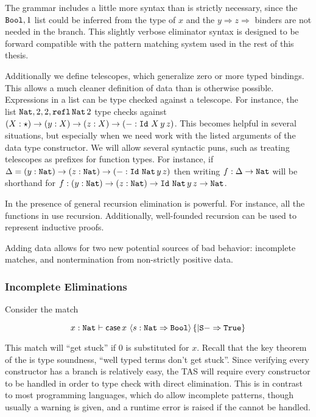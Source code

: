 The grammar includes a little more syntax than is strictly necessary, since the $\mathtt{Bool}{},1$ list could be inferred from the type of $x$ and the $y\Rightarrow z\Rightarrow$ binders are not needed in the branch.
This slightly verbose \case{} eliminator syntax is designed to be forward compatible with the pattern matching system used in the rest of this thesis. 

Additionally we define telescopes, which generalize zero or more typed bindings.
This allows a much cleaner definition of data than is otherwise possible.
Expressions in a list can be type checked against a telescope. %
For instance, the list $\mathtt{Nat}{},2,2,\mathtt{refl}\,\mathtt{Nat}{}\,2$ type checks against $\left(X:\star\right)\rightarrow\left(y:X\right)\rightarrow\left(z:X\right)\rightarrow\left(-:\Id{}\ X\,y\,z\right)$.
This becomes helpful in several situations, but especially when we need work with the listed arguments of the data type constructor.
We will allow several syntactic puns, such as treating telescopes as prefixes for function types.
For instance, 
  if $\Delta=\left(y:\mathtt{Nat}{} \right)\rightarrow\left(z:\mathtt{Nat}{} \right)\rightarrow\left(-:\mathtt{Id}{}\ \mathtt{Nat}{} \,y\,z\right)$
  then writing $f:\Delta\rightarrow\mathtt{Nat}{} $
  will be shorthand for $f:\left(y:\mathtt{Nat}{} \right)\rightarrow\left(z:\mathtt{Nat}{} \right)\rightarrow \mathtt{Id}{}\ \mathtt{Nat}{} \,y\,z\rightarrow\mathtt{Nat}{}$.

In the presence of general recursion \case{} elimination is powerful.
For instance, all the functions in  use recursion.
Additionally, well-founded recursion can be used to represent inductive proofs.

Adding data allows for two new potential sources of bad behavior: incomplete matches, and nontermination from non-strictly positive data. 

\subsubsection{Incomplete Eliminations}

Consider the match 

\[
x:\mathtt{Nat}{}\vdash\mathsf{case}{}\,x\,\left\langle s:\mathtt{Nat}{}\Rightarrow\mathtt{Bool}{}\right\rangle \left\{ |\mathtt{S}{}-\Rightarrow \mathtt{True}{}\right\} 
\]

This match will ``get stuck'' if $0$ is substituted for $x$.
Recall that the key theorem of the \slang{} is type soundness, ``well typed terms don't get stuck''.
Since verifying every constructor has a branch is relatively easy, the \slang{} \ac{TAS} will require every constructor to be handled in order to type check with direct elimination.
This is in contrast to most programming languages, which do allow incomplete patterns, though usually a warning is given, and a runtime error is raised if the \scrut{} cannot be handled.

